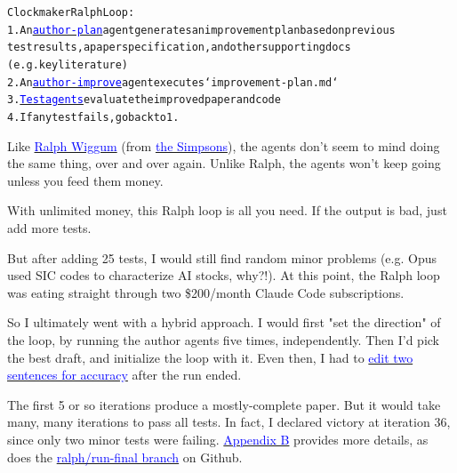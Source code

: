\documentclass[12pt]{article}
\begin{document}
\begin{mdframed}[
linewidth=1pt,
linecolor=black,
innerleftmargin=0.25em,
innerrightmargin=0.25em,
innertopmargin=0.2\baselineskip,
innerbottommargin=0.8\baselineskip
]
\begin{mdframed}[backgroundcolor=gray!10,linewidth=0.6pt,linecolor=gray!70,roundcorner=2pt,innerleftmargin=0.6em,innerrightmargin=0.6em,innertopmargin=0.5\baselineskip,innerbottommargin=0.5\baselineskip]
\begingroup
\small
\setlength{\parindent}{0pt}
\setlength{\parskip}{0pt}
\begin{alltt}

Clockmaker Ralph Loop:
    1. An \href{https://github.com/redacted/ralph-wiggum-asset-pricing/blob/main/ralph/author-plan.py}{\textcolor{blue}{author-plan}} agent generates an improvement plan based on previous 
       test results, a paper specification, and other supporting docs 
       (e.g. key literature)
    2. An \href{https://github.com/redacted/ralph-wiggum-asset-pricing/blob/main/ralph/author-improve.py}{\textcolor{blue}{author-improve}} agent executes `improvement-plan.md`
    3. \href{https://github.com/redacted/ralph-wiggum-asset-pricing/tree/main/tests}{\textcolor{blue}{Test agents}} evaluate the improved paper and code 
    4. If any test fails, go back to 1.
\end{alltt}
\endgroup
\end{mdframed}

Like \href{https://en.wikipedia.org/wiki/Ralph_Wiggum}{\textcolor{blue}{Ralph Wiggum}} (from \href{https://en.wikipedia.org/wiki/The_Simpsons}{\textcolor{blue}{the Simpsons}}), the agents don't seem to mind doing the same thing, over and over again. Unlike Ralph, the agents won't keep going unless you feed them money.

With unlimited money, this Ralph loop is all you need. If the output is bad, just add more tests.

But after adding 25 tests, I would still find random minor problems (e.g. Opus used SIC codes to characterize AI stocks, why?!). At this point, the Ralph loop was eating straight through two \$200/month Claude Code subscriptions.

So I ultimately went with a hybrid approach. I would first "set the direction" of the loop, by running the author agents five times, independently. Then I'd pick the best draft, and initialize the loop with it. Even then, I had to \href{https://github.com/redacted/ralph-wiggum-asset-pricing/commit/4bed451b406d6c1190ef42e33517946c980d822d}{\textcolor{blue}{edit two sentences for accuracy}} after the run ended.

The first 5 or so iterations produce a mostly-complete paper. But it would take many, many iterations to pass all tests. In fact, I declared victory at iteration 36, since only two minor tests were failing. \hyperref[appendix:iter-log]{\textcolor{blue}{Appendix B}} provides more details, as does the \href{https://github.com/redacted/ralph-wiggum-asset-pricing/commits/ralph/run-final/}{\textcolor{blue}{ralph/run-final branch}} on Github.


\end{mdframed}
\end{document}
